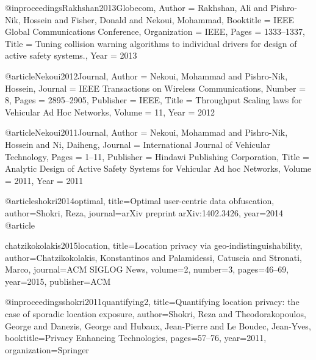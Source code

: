 {{{{{{{{{@inproceedings{Rakhshan2013Globecom,
	Author = {Rakhshan, Ali and Pishro-Nik, Hossein and Fisher, Donald and Nekoui, Mohammad},
	Booktitle = {IEEE Global Communications Conference},
	Organization = {IEEE},
	Pages = {1333--1337},
	Title = {Tuning collision warning algorithms to individual drivers for design of active safety systems.},
	Year = {2013}}

@article{Nekoui2012Journal,
	Author = {Nekoui, Mohammad and Pishro-Nik, Hossein},
	Journal = {IEEE Transactions on Wireless Communications},
	Number = {8},
	Pages = {2895--2905},
	Publisher = {IEEE},
	Title = {Throughput Scaling laws for Vehicular Ad Hoc Networks},
	Volume = {11},
	Year = {2012}}









@article{Nekoui2011Journal,
	Author = {Nekoui, Mohammad and Pishro-Nik, Hossein and Ni, Daiheng},
	Journal = {International Journal of Vehicular Technology},
	Pages = {1--11},
	Publisher = {Hindawi Publishing Corporation},
	Title = {Analytic Design of Active Safety Systems for Vehicular Ad hoc Networks},
	Volume = {2011},
	Year = {2011}}





	
@article{shokri2014optimal,
	  title={Optimal user-centric data obfuscation},
 	 author={Shokri, Reza},
 	 journal={arXiv preprint arXiv:1402.3426},
 	 year={2014}
	}
@article{chatzikokolakis2015location,
  title={Location privacy via geo-indistinguishability},
  author={Chatzikokolakis, Konstantinos and Palamidessi, Catuscia and Stronati, Marco},
  journal={ACM SIGLOG News},
  volume={2},
  number={3},
  pages={46--69},
  year={2015},
  publisher={ACM}

}
@inproceedings{shokri2011quantifying2,
  title={Quantifying location privacy: the case of sporadic location exposure},
  author={Shokri, Reza and Theodorakopoulos, George and Danezis, George and Hubaux, Jean-Pierre and Le Boudec, Jean-Yves},
  booktitle={Privacy Enhancing Technologies},
  pages={57--76},
  year={2011},
  organization={Springer}
}


}}}}}}}}}
